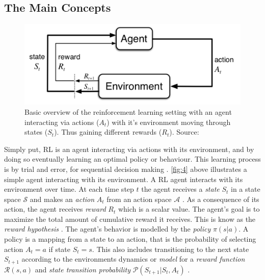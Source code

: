 \documentclass{kththesis}
\theoremstyle{definition}
\begin{document}
\subsection{The Main Concepts}
\begin{figure}[H]
    \centering
    \includegraphics[scale=1]{basicRL.png}
    \caption{Basic overview of the reinforcement learning setting with an agent interacting via actions ($A_t$) with it's environment moving through states ($S_t$). Thus gaining different rewards ($R_t$). Source: \textcite{sutton1998reinforcement} }
    \label{fig:4}
\end{figure}

Simply put, RL is an agent interacting via actions with its environment, and by doing so eventually learning an optimal policy or behaviour. This learning process is by trial and error, for sequential decision making \parencite{li2017deep}. \autoref{fig:4} above illustrates a simple agent interacting with its environment. A RL agent interacts with its environment over time. At each time step $t$ the agent receives  a \textit{state} $S_t$ in a state space $\mathcal{S}$ and makes an \textit{action} $A_t$ from an action space $\mathcal{A}$ \parencite{li2017deep}. As a consequence of its action, the agent receives \textit{reward} $R_t$ which is a scalar value. 
\newline
\newline
The agent's goal is to maximize the total amount of cumulative reward it receives. This is know as the \textit{reward hypothesis} \parencite{sutton1998reinforcement}. The agent's behavior is modelled by the \textit{policy} $\pi(s|a)$. A policy is a mapping from a state to an action, that is the probability of selecting action $A_t=a$ if state $S_t = s$. This also includes transitioning to the next state $S_{t+1}$ according to the environments dynamics or \textit{model} for a \textit{reward function} $\mathcal{R}(s,a)$ and \textit{state transition probability} $\mathcal{P}(S_{t+1} |S_t, A_t)$ \parencite{li2017deep}.
\end{document}
